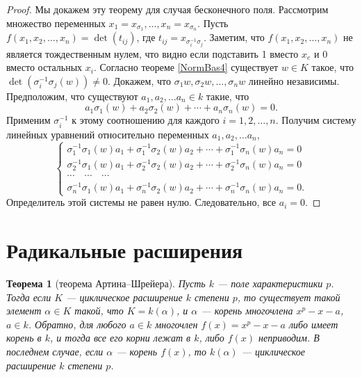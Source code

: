 \documentclass[12pt, titlepage, oneside]{amsbook}
\newtheorem{theorem}{Теорема}[chapter]
\theoremstyle{definition}
\theoremstyle{remark}
\begin{document}
\begin{proof}
Мы докажем эту теорему для случая бесконечного поля. Рассмотрим множество переменных $x_1=x_{\sigma_1},\ldots,x_n=x_{\sigma_n}$. Пусть $f(x_1,x_2,\ldots,x_n)=\det(t_{ij})$, где $t_{ij}=x_{\sigma^{-1}_i\sigma_j}$. Заметим, что $f(x_1,x_2,\ldots,x_n)$ не является тождественным нулем, что видно если подставить 1 вместо $x_e$ и 0 вместо остальных $x_i$. Согласно теореме \ref{NormBas4} существует $w\in K$ такое, что $\det(\sigma^{-1}_i\sigma_j(w))\neq 0$. Докажем, что $\sigma_1 w,\sigma_2 w,\ldots,\sigma_n w$ линейно независимы. Предположим, что существуют $a_1,a_2,\ldots a_n\in k$ такие, что $$a_1\sigma_1(w)+a_2\sigma_2(w)+\cdots+a_n\sigma_n(w)=0.$$ Применим $\sigma^{-1}_i$ к этому соотношению для каждого $i=1,2,\ldots,n$. Получим систему линейных уравнений относительно переменных $a_1,a_2,\ldots a_n$, $$\begin{cases}\sigma^{-1}_1\sigma_1(w)a_1+\sigma^{-1}_1\sigma_2(w)a_2+\cdots+\sigma^{-1}_1\sigma_n(w)a_n=0\\
\sigma^{-1}_2\sigma_1(w)a_1+\sigma^{-1}_2\sigma_2(w)a_2+\cdots+\sigma^{-1}_2\sigma_n(w)a_n=0\\
\cdots\quad\cdots\quad\cdots\\
\sigma^{-1}_n\sigma_1(w)a_1+\sigma^{-1}_n\sigma_2(w)a_2+\cdots+\sigma^{-1}_n\sigma_n(w)a_n=0.\end{cases}$$ Определитель этой системы не равен нулю. Следовательно, все $a_i=0$.
\end{proof}

\section{Радикальные расширения}


\begin{theorem}[теорема Артина--Шрейера]
\label{ArtShr}
Пусть $k$ --- поле характеристики $p$. Тогда если $K$ --- циклическое расширение $k$ степени $p$, то существует такой элемент $\alpha\in K$ такой, что $K=k(\alpha)$, и $\alpha$ --- корень многочлена $x^p-x-a$, $a\in k$.
Обратно, для любого $a\in k$ многочлен $f(x)=x^p-x-a$ либо имеет корень в $k$, и тогда все его корни лежат в $k$, либо $f(x)$ неприводим. В последнем случае, если $\alpha$ --- корень $f(x)$, то $k(\alpha)$ --- циклическое расширение $k$ степени $p$.
\end{theorem}
\end{document}
